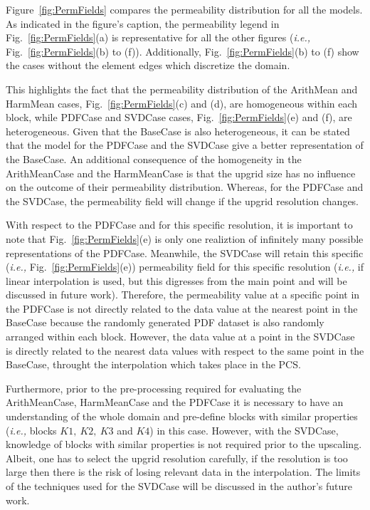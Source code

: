 \documentclass[preprint,12pt]{elsarticle}
\newcommand{\ie}{{\it i.e., }}
\begin{document}
Figure~\ref{fig:PermFields} compares the permeability distribution for all the models. As indicated in the figure's caption, the permeability legend in Fig.~\ref{fig:PermFields}(a) is representative for all the other figures (\ie Fig.~\ref{fig:PermFields}(b) to (f)). Additionally, Fig.~\ref{fig:PermFields}(b) to (f) show the cases without the element edges which discretize the domain.

This highlights the fact that the permeability distribution of the ArithMean and HarmMean cases, Fig.~\ref{fig:PermFields}(c) and (d), are homogeneous within each block, while PDFCase and SVDCase cases, Fig.~\ref{fig:PermFields}(e) and (f), are heterogeneous. Given that the BaseCase is also heterogeneous, it can be stated that the model for the PDFCase and the SVDCase give a better representation of the BaseCase. An additional consequence of the homogeneity in the ArithMeanCase and the HarmMeanCase is that the upgrid size has no influence on the outcome of their permeability distribution. Whereas, for the PDFCase and the SVDCase, the permeability field will change if the upgrid resolution changes.

With respect to the PDFCase and for this specific resolution, it is important to note that Fig.~\ref{fig:PermFields}(e) is only one realiztion of infinitely many possible representations of the PDFCase. Meanwhile, the SVDCase will retain this specific (\ie Fig.~\ref{fig:PermFields}(e)) permeability field for this specific resolution (\ie if linear interpolation is used, but this digresses from the main point and will be discussed in future work). Therefore, the permeability value at a specific point in the PDFCase is not directly related to the data value at the nearest point in the BaseCase because the randomly generated PDF dataset is also randomly arranged within each block. However, the data value at a point in the SVDCase is directly related to the nearest data values with respect to the same point in the BaseCase, throught the interpolation which takes place in the PCS.

Furthermore, prior to the pre-processing required for evaluating the ArithMeanCase, HarmMeanCase and the PDFCase it is necessary to have an understanding of the whole domain and pre-define blocks with similar properties (\ie blocks $K1,~K2,~K3$ and $K4$) in this case. However, with the SVDCase, knowledge of blocks with similar properties is not required prior to the upscaling. Albeit, one has to select the upgrid resolution carefully, if the resolution is too large then there is the risk of losing relevant data in the interpolation. The limits of the techniques used for the SVDCase will be discussed in the author's future work.
\end{document}
